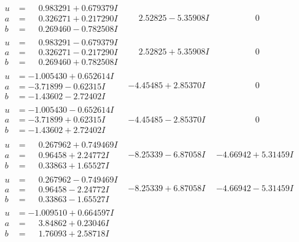 \documentclass[1p]{elsarticle_modified}
\theoremstyle{definition}
\begin{document}
$$\begin{array}{c|c|c}
\begin{aligned}
u &= \phantom{-}0.983291 + 0.679379 I \\
a &= \phantom{-}0.326271 + 0.217290 I \\
b &= \phantom{-}0.269460 - 0.782508 I\end{aligned}
 & \phantom{-}2.52825 - 5.35908 I & \phantom{-0.000000 } 0 \\ \hline\begin{aligned}
u &= \phantom{-}0.983291 - 0.679379 I \\
a &= \phantom{-}0.326271 - 0.217290 I \\
b &= \phantom{-}0.269460 + 0.782508 I\end{aligned}
 & \phantom{-}2.52825 + 5.35908 I & \phantom{-0.000000 } 0 \\ \hline\begin{aligned}
u &= -1.005430 + 0.652614 I \\
a &= -3.71899 - 0.62315 I \\
b &= -1.43602 - 2.72402 I\end{aligned}
 & -4.45485 + 2.85370 I & \phantom{-0.000000 } 0 \\ \hline\begin{aligned}
u &= -1.005430 - 0.652614 I \\
a &= -3.71899 + 0.62315 I \\
b &= -1.43602 + 2.72402 I\end{aligned}
 & -4.45485 - 2.85370 I & \phantom{-0.000000 } 0 \\ \hline\begin{aligned}
u &= \phantom{-}0.267962 + 0.749469 I \\
a &= \phantom{-}0.96458 + 2.24772 I \\
b &= \phantom{-}0.33863 + 1.65527 I\end{aligned}
 & -8.25339 - 6.87058 I & -4.66942 + 5.31459 I \\ \hline\begin{aligned}
u &= \phantom{-}0.267962 - 0.749469 I \\
a &= \phantom{-}0.96458 - 2.24772 I \\
b &= \phantom{-}0.33863 - 1.65527 I\end{aligned}
 & -8.25339 + 6.87058 I & -4.66942 - 5.31459 I \\ \hline\begin{aligned}
u &= -1.009510 + 0.664597 I \\
a &= \phantom{-}3.84862 + 0.23046 I \\
b &= \phantom{-}1.76093 + 2.58718 I\end{aligned}

\end{array}$$
\end{document}
